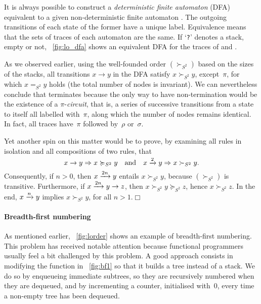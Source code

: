 It is always possible to construct a \emph{deterministic finite
  automaton} (DFA) equivalent to a given non\hyp{}deterministic finite
automaton \citep{VanLeeuwen_1990c,HopcroftMotwaniUllman_2003}. The
outgoing transitions of each state of the former have a unique
label. Equivalence means that the sets of traces of each automaton are
the same. If `\texttt{?}' denotes a stack, empty or not,
\fig~\vref{fig:lo_dfa} shows an equivalent DFA for the traces of
 and .

As we observed earlier, using the well\hyp{}founded order
\((\succ_{S^2})\) based on the sizes of the stacks, all transitions
\(x \rightarrow y\) in the DFA satisfy \(x \succ_{S^2} y\),
except~\(\pi\), for which \(x =_{S^2} y\) holds (the total number of
nodes is invariant). We can nevertheless conclude that 
terminates because the only way to have non\hyp{}termination would be
the existence of a \(\pi\)-\emph{circuit}, that is, a series of
successive transitions from a state to itself all labelled
with~\(\pi\), along which the number of nodes remains identical. In
fact, all traces have~\(\pi\) followed by~\(\rho\) or~\(\sigma\).

Yet another spin on this matter would be to prove, by examining all
rules in isolation and all compositions of two rules, that
\begin{equation*}
x \rightarrow y \Rightarrow x \succcurlyeq_{S^2} y
\quad \text{and} \quad
x \xrightarrow{\smash{2}} y \Rightarrow x \succ_{S^2} y.
\end{equation*}
Consequently, if \(n > 0\), then \(x \xrightarrow{\smash{2n}} y\)
entails \(x \succ_{S^2} y\), because \((\succ_{S^2})\) is
transitive. Furthermore, if \(x \xrightarrow{\smash{2n}} y \rightarrow
z\), then \(x \succ_{S^2} y \succcurlyeq_{S^2} z\), hence \(x
\succ_{S^2} z\). In the end, \(x \xrightarrow{\smash{n}} y\) implies
\(x \succ_{S^2} y\), for all \(n > 1\).\hfill\(\Box\)

\paragraph{Breadth-first numbering}

As mentioned earlier, \fig~\vref{fig:lorder} shows an example of
breadth\hyp{}first numbering. This problem has received notable
attention \citep{JonesGibbons_1993,GibbonsJones_1998,Okasaki_2000}
because functional programmers usually feel a bit challenged by this
problem. A good approach consists in modifying the function
 in \fig~\vref{fig:bf1} so
that it builds a tree instead of a stack. We do so by enqueueing
immediate subtrees, so they are recursively numbered when they are
dequeued, and by incrementing a counter, initialised with~\(0\), every
time a non\hyp{}empty tree has been dequeued.

